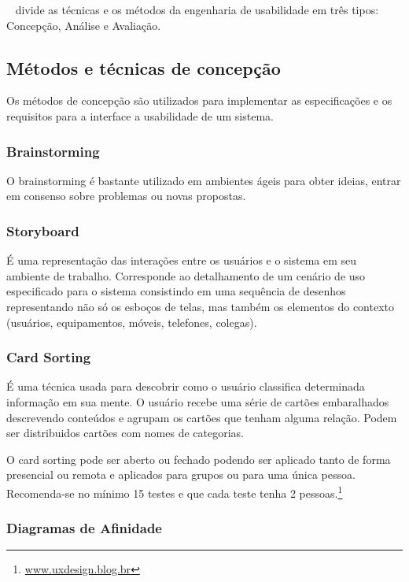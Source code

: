 	~ divide as técnicas e os métodos da engenharia de usabilidade em três tipos: Concepção, Análise e Avaliação.

\subsection{Métodos e técnicas de concepção}

	Os métodos de concepção são utilizados para implementar as especificações e os requisitos para a interface a usabilidade de um sistema.

\subsubsection{Brainstorming}

	O brainstorming é bastante utilizado em ambientes ágeis para obter ideias, entrar em consenso sobre problemas ou novas propostas.

\subsubsection{Storyboard}

É uma representação das interações entre os usuários e o sistema em seu ambiente de trabalho. Corresponde ao detalhamento de um cenário de uso especificado para o sistema consistindo em uma sequência de desenhos representando não só os esboços de telas, mas também os elementos do contexto (usuários, equipamentos, móveis, telefones, colegas).

\subsubsection{Card Sorting}

	É uma técnica usada para descobrir como o usuário classifica determinada informação em sua mente. O usuário recebe uma série de cartões embaralhados descrevendo conteúdos e agrupam os cartões que tenham alguma relação. Podem ser distribuidos cartões com nomes de categorias.
	
	O card sorting pode ser aberto ou fechado podendo ser aplicado tanto de forma presencial ou remota e aplicados para grupos ou para uma única pessoa. Recomenda-se no mínimo 15 testes e que cada teste tenha 2 pessoas.\footnote{\url{www.uxdesign.blog.br}}
	
\subsubsection{Diagramas de Afinidade}

